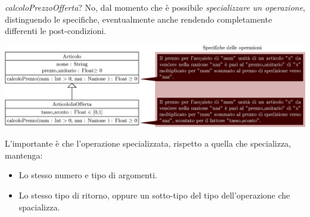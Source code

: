 \documentclass[12pt, letterpaper]{article}
\begin{document}
 \textit{calcoloPrezzoOfferta}? No, dal momento che è possibile \textit{specializzare un operazione}, distinguendo 
 le specifiche, eventualmente anche rendendo completamente differenti le post-condizioni. \begin{center}
    \includegraphics[width=\textwidth ]{images/specOperazione.eps}
 \end{center}
 L'importante è che l'operazione specializzata, rispetto a quella che specializza, mantenga:\begin{itemize}
    \item Lo stesso numero e tipo di argomenti.
    \item Lo stesso tipo di ritorno, oppure un sotto-tipo del tipo dell'operazione che spacializza.
 \end{itemize}
\end{document}
